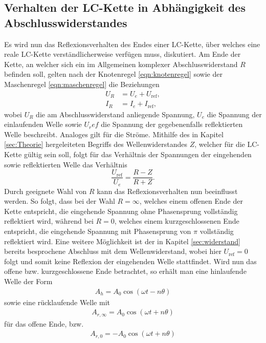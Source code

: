 \subsection{Verhalten der LC-Kette in Abhängigkeit des Abschlusswiderstandes}
\label{sec:verhalten}
Es wird nun das Reflexionsverhalten des Endes einer LC-Kette, über welches eine reale LC-Kette verständlicherweise verfügen muss, diskutiert.
Am Ende der Kette, an welcher sich ein im Allgemeinen komplexer Abschlusswiderstand $R$ befinden soll, gelten nach der Knotenregel \eqref{eqn:knotenregel} sowie der Maschenregel \eqref{eqn:maschenregel} die Beziehungen
\begin{align}
  U_R &= U_e + U_{\text{ref}}, \\
  I_R &= I_e + I_{\text{ref}},
\end{align}
wobei $U_R$ die am Abschlusswiderstand anliegende Spannung, $U_e$ die Spannung der einlaufenden Welle sowie $U_ref$ die Spannung der gegebenenfalls reflektierten Welle beschreibt.
Analoges gilt für die Ströme.
Mithilfe des in Kapitel \ref{sec:Theorie} hergeleiteten Begriffs des Wellenwiderstandes $Z$, welcher für die LC-Kette gültig sein soll, folgt für das Verhältnis der Spannungen der eingehenden sowie reflektierten Welle das Verhältnis
\begin{equation}
  \frac{U_{\text{ref}}}{U_e} = \frac{R - Z}{R + Z}.
\end{equation}
Durch geeignete Wahl von $R$ kann das Reflexionsverhalten nun beeinflusst werden.
So folgt, dass bei der Wahl $R=\infty$, welches einem offenen Ende der Kette entspricht, die eingehende Spannung ohne Phasensprung vollständig reflektiert wird, während bei $R=0$, welches einem kurzgeschlossenen Ende entspricht, die eingehende Spannung mit Phasensprung von $\pi$ vollständig reflektiert wird.
Eine weitere Möglichkeit ist der in Kapitel \ref{sec:widerstand} bereits besprochene Abschluss mit dem Wellenwiderstand, wobei hier $U_{\text{ref}} = 0$ folgt und somit keine Reflexion der eingehenden Welle stattfindet.
Wird nun das offene bzw. kurzgeschlossene Ende betrachtet, so erhält man eine hinlaufende Welle der Form
\begin{align*}
  A_h = A_0 \cos{(\omega t - n \theta)}
\end{align*}
sowie eine rücklaufende Welle mit
\begin{align*}
  A_{r, \infty} = A_0 \cos{(\omega t + n \theta)}
\end{align*}
für das offene Ende, bzw.
\begin{align*}
  A_{r, 0} = - A_0 \cos{(\omega t + n \theta)}
\end{align*}
